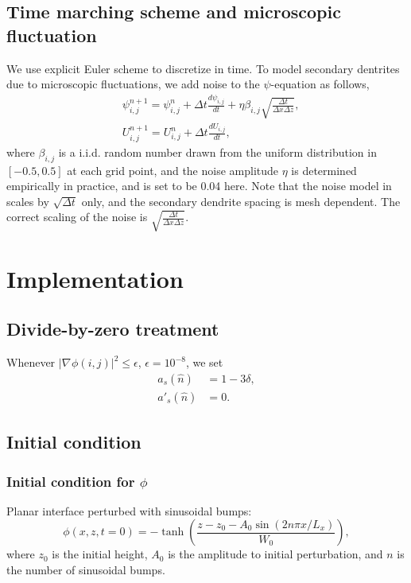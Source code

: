 \documentclass[final,times]{elsarticle}
\numberwithin{equation}{section}
\newcommand{\grad}[1]{\nabla_{#1}}
\begin{document}
\subsection{Time marching scheme and microscopic fluctuation}
We use explicit Euler scheme to discretize  in time. To model secondary dentrites due to microscopic fluctuations, we add noise to the $\psi$-equation as follows,
\begin{align}
& \psi_{i,j}^{n+1} = \psi_{i,j}^n + \Delta t  \frac{d \psi_{i,j}}{dt}  + \eta \beta_{i,j} \sqrt{ \frac{\Delta t}{ \Delta x \Delta z}  },  \\
& U_{i,j} ^{n+1} = U_{i,j}^n + \Delta t \frac{dU_{i,j}}{dt},
\end{align}
where $\beta_{i,j}$ is a i.i.d. random number drawn from the uniform distribution in $[-0.5,0.5]$ at each grid point, and the noise amplitude $\eta$ is determined empirically in practice, and is set to be 0.04 here. Note that the noise model in \cite{Tourret2015} scales by $\sqrt{\Delta t}$ only, and the secondary dendrite spacing is mesh dependent. The correct scaling of the noise is $\sqrt{ \frac{\Delta t}{ \Delta x \Delta z}  }$.

\section{Implementation}


\subsection{Divide-by-zero treatment}
Whenever $|\grad{}\phi(i,j)|^{2} \leq \epsilon $, $\epsilon = 10^{-8}$, we set \cite{Provatas2010}
\begin{align*}
a_s(\hat{n}) &= 1-3\delta, \\
a'_s(\hat{n}) &= 0.
\end{align*}

\subsection{Initial condition}
\subsubsection{Initial condition for $\phi$}
Planar interface perturbed with sinusoidal bumps:
\begin{equation}
\phi(x,z,t=0) = - \tanh \left( \frac{z - z_0 - A_0\sin(2n\pi x /L_x  ) }{W_0}  \right),
\end{equation}
where $z_0$ is the initial height, $A_0$ is the amplitude to initial perturbation, and $n$ is the number of  sinusoidal bumps.  
\end{document}
